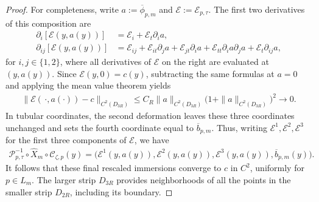 \documentclass[a4paper,11pt,oneside,reqno]{amsart}
\numberwithin{equation}{section}
\theoremstyle{definition}
\begin{document}
\begin{proof}
    For completeness, write $a:=\overline\phi_{p,m}$ and
    $\mathcal E:=\mathcal E_{p,\tau}$. The first two
    derivatives of this composition are
    \begin{align*}
        \partial_i[\mathcal E(y,a(y))]
        &=\mathcal E_i+\mathcal E_t\partial_i a,\\
        \partial_{ij}[\mathcal E(y,a(y))]
        &=\mathcal E_{ij}
          +\mathcal E_{it}\partial_j a
          +\mathcal E_{jt}\partial_i a
          +\mathcal E_{tt}\partial_i a\partial_j a
          +\mathcal E_t\partial_{ij}a,
    \end{align*}
    for $i,j\in\{1,2\}$, where all derivatives of
    $\mathcal E$ on the right are evaluated at $(y,a(y))$.
    Since $\mathcal E(y,0)=c(y)$, subtracting the same
    formulas at $a=0$ and applying the mean value theorem
    yields
    \begin{align*}
        \|\mathcal E(\,
          \cdot,a(\cdot))-c\|_{C^2(D_{3R})}
        \leq C_R\|a\|_{C^2(D_{3R})}
                    \bigl(1+\|a\|_{C^2(D_{3R})}\bigr)^2
        \rightarrow0.
    \end{align*}
    In tubular coordinates, the second deformation leaves
    these three coordinates unchanged and sets the fourth
    coordinate equal to $\overline b_{p,m}$. Thus, writing
    $\mathcal E^1,\mathcal E^2,\mathcal E^3$ for the first
    three components of $\mathcal E$, we have
    \begin{align*}
        \mathcal P_{p,\tau}^{-1}
          \circ\widehat X_m\circ\mathcal C_{\zeta,p}(y)
        =\bigl(\mathcal E^1(y,a(y)),
                \mathcal E^2(y,a(y)),
                \mathcal E^3(y,a(y)),
                \overline b_{p,m}(y)\bigr).
    \end{align*}
    It follows that these final rescaled immersions converge
    to $c$ in $C^2$, uniformly for $p\in L_m$. The larger
    strip $D_{3R}$ provides neighborhoods of all the points
    in the smaller strip $D_{2R}$, including its boundary.


\end{proof}
\end{document}
